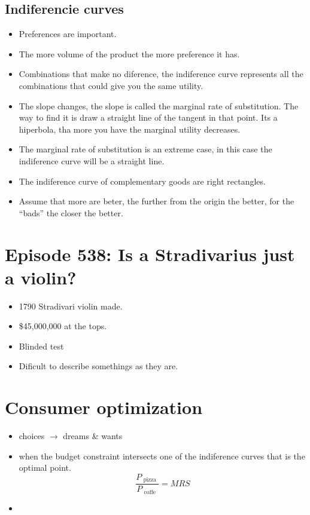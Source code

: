 \documentclass{article}
\begin{document}
\subsection{Indiferencie curves}
\begin{itemize}
    \item Preferences are important.
    \item The more volume of the product the more preference it has. 
    \item Combinations that make no diference, the indiference curve represents all the combinations that could give you the same utility.
    \item The slope changes, the slope is called the marginal rate of substitution. The way to find it is draw a straight line of the tangent in that point. Its a hiperbola, tha more you have the marginal utility decreases.
    \item The marginal rate of substitution is an extreme case, in this case the indiference curve will be a straight line.
    \item The indiference curve of complementary goods are right rectangles. 
    \item Assume that more are beter, the further from the origin the better, for the ``bads'' the closer the better.
\end{itemize}

\section{Episode 538: Is a Stradivarius just a violin?}
\begin{itemize}
    \item 1790 Stradivari violin made.
    \item \$45,000,000 at the tops.
    \item Blinded test 
    \item Dificult to describe somethings as they are.
\end{itemize}

\section{Consumer optimization}
\begin{itemize}
    \item choices $\rightarrow$ dreams \& wants
    \item when the budget constraint intersects one of the indiference curves that is the optimal point.
    \[
      \frac{P_{\text{  pizza  }}}{P_{\text{  coffe  }   }} = MRS  
    \]

    
    \item 
\end{itemize} 
\end{document}
